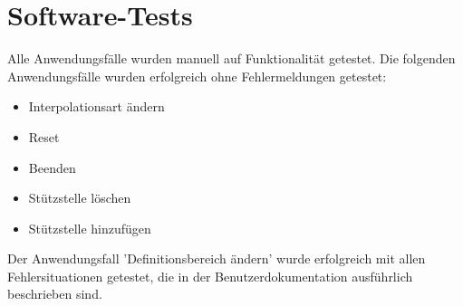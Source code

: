 \section{Software-Tests}
Alle Anwendungsf\"alle wurden manuell auf Funktionalit\"at getestet. Die folgenden Anwendungsf\"alle wurden erfolgreich ohne Fehlermeldungen getestet:
\begin{itemize}
  \item Interpolationsart \"andern
  \item Reset
  \item Beenden
  \item St\"utzstelle l\"oschen
  \item St\"utzstelle hinzuf\"ugen
\end{itemize}
Der Anwendungsfall 'Definitionsbereich \"andern' wurde erfolgreich mit allen Fehlersituationen getestet, die in der Benutzerdokumentation ausf\"uhrlich beschrieben sind.








